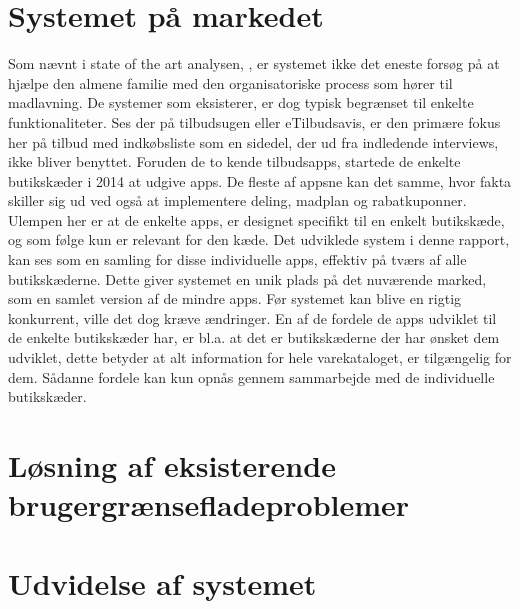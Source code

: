 \section{Systemet på markedet}
Som nævnt i state of the art analysen, , er systemet ikke det eneste forsøg på at hjælpe den almene familie med den organisatoriske process som hører til madlavning.
De systemer som eksisterer, er dog typisk begrænset til enkelte funktionaliteter.
Ses der på tilbudsugen eller eTilbudsavis, er den primære fokus her på tilbud med indkøbsliste som en sidedel, der ud fra indledende interviews, ikke bliver benyttet.
Foruden de to kende tilbudsapps, startede de enkelte butikskæder i 2014 at udgive apps.
De fleste af appsne kan det samme, hvor fakta skiller sig ud ved også at implementere deling, madplan og rabatkuponner.
Ulempen her er at de enkelte apps, er designet specifikt til en enkelt butikskæde, og som følge kun er relevant for den kæde.
Det udviklede system i denne rapport, kan ses som en samling for disse individuelle apps, effektiv på tværs af alle butikskæderne.
Dette giver systemet en unik plads på det nuværende marked, som en samlet version af de mindre apps.
Før systemet kan blive en rigtig konkurrent, ville det dog kræve ændringer.
En af de fordele de apps udviklet til de enkelte butikskæder har, er bl.a. at det er butikskæderne der har ønsket dem udviklet, dette betyder at alt information for hele varekataloget, er tilgængelig for dem.
Sådanne fordele kan kun opnås gennem sammarbejde med de individuelle butikskæder.

\section{Løsning af eksisterende brugergrænsefladeproblemer}

\section{Udvidelse af systemet}
